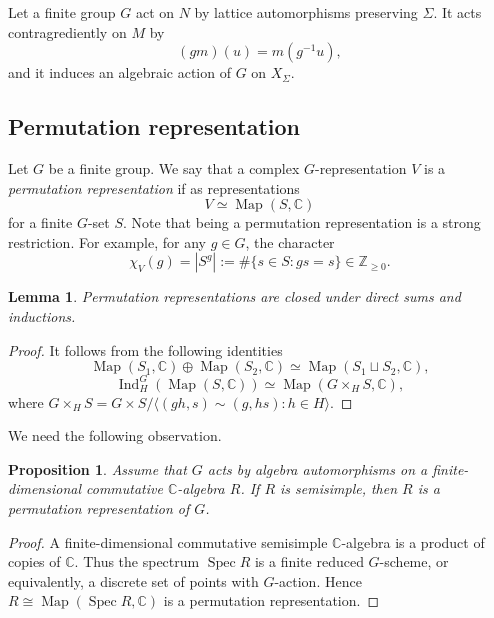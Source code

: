 \documentclass[12pt]{amsart}
\newtheorem{lemma}[theorem]{Lemma}
\newtheorem{prop}[theorem]{Proposition}
\theoremstyle{remark}
\begin{document}
Let a finite group $G$ act on $N$ by lattice automorphisms preserving
$\Sigma$. It acts contragrediently on $M$ by
\begin{equation*}
  (gm)(u)=m(g^{-1}u),
\end{equation*} and it induces an  algebraic action of $G$ on $X_\Sigma$.  

\subsection{Permutation representation}
Let $G$ be a finite group. 
We say that a complex $G$-representation $V$ is a \emph{permutation representation} if as representations 
\begin{equation*} 
   V\simeq \operatorname{Map}(S,\mathbb{C}) 
\end{equation*}
for a finite $G$-set $S$. 
Note that being a permutation representation is a strong restriction. For example, for any $g\in G$, the character 
$$\chi_V(g)=|S^g|:=\#\{s\in S: gs=s\}\in \mathbb{Z}_{\geq 0}.$$

\begin{lemma}\label{lem:permisind}
Permutation representations are closed under direct sums and inductions. 
\end{lemma}
\begin{proof}
It follows from the following identities
$$
\operatorname{Map}(S_1,\mathbb{C})\oplus 
\operatorname{Map}(S_2,\mathbb{C})\simeq 
\operatorname{Map}(S_1\sqcup S_2,\mathbb{C}),$$
$$\operatorname{Ind}_H^G(\operatorname{Map}(S,\mathbb{C}))
\simeq \operatorname{Map}(G\times_H S,\mathbb{C}),$$
where $G\times_H S =G\times S\big/ \langle (gh,s)\sim (g,hs):h\in H\rangle $. 
\end{proof}

We need the following observation. 

\begin{prop}\label{prop:semisimple}
Assume that $G$ acts by algebra automorphisms on a finite-dimensional commutative $\mathbb{C}$-algebra $R$. 
If $R$ is semisimple, then $R$ is a permutation representation of $G$. 
\end{prop}
\begin{proof}
A finite-dimensional commutative semisimple $\mathbb{C}$-algebra is a product of
copies of $\mathbb{C}$. Thus the spectrum $\operatorname{Spec}R$ is a finite reduced $G$-scheme, or equivalently, a discrete set of points with $G$-action. 
Hence $R\cong \operatorname{Map}(\operatorname{Spec}R,\mathbb{C})$ is a permutation representation.
\end{proof}
\end{document}
